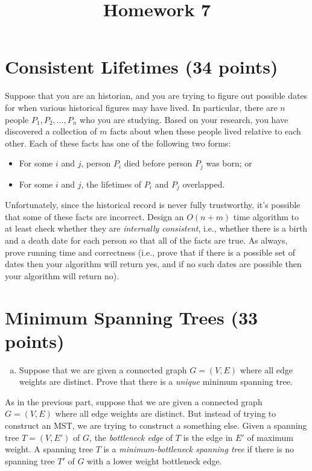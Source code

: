 \documentclass{article}
\begin{document}
\title{Homework 7}
\maketitle
\thispagestyle{fancy}


\section{Consistent Lifetimes (34 points)}

Suppose that you are an historian, and you are trying to figure out possible dates for when various historical figures may have lived.  In particular, there are $n$ people $P_1, P_2, \dots, P_n$ who you are studying.  Based on your research, you have discovered a collection of $m$ facts about when these people lived relative to each other.  Each of these facts has one of the following two forms:
\begin{itemize}
\item For some $i$ and $j$, person $P_i$ died before person $P_j$ was born; or
\item For some $i$ and $j$, the lifetimes of $P_i$ and $P_j$ overlapped.
\end{itemize}

Unfortunately, since the historical record is never fully trustworthy, it's possible that some of these facts are incorrect.  Design an $O(n+m)$ time algorithm to at least check whether they are \emph{internally consistent}, i.e., whether there is a birth and a death date for each person so that all of the facts are true.  As always, prove running time and correctness (i.e., prove that if there is a possible set of dates then your algorithm will return yes, and if no such dates are possible then your algorithm will return no).

\section{Minimum Spanning Trees (33 points)}

\begin{enumerate}[(a)]
\item Suppose that we are given a connected graph $G = (V, E)$ where all edge weights are distinct.  Prove that there is a \emph{unique} minimum spanning tree.  
\end{enumerate}

As in the previous part, suppose that we are given a connected graph $G = (V, E)$ where all edge weights are distinct.  But instead of trying to construct an MST, we are trying to construct a something else.  Given a spanning tree $T = (V, E')$ of $G$, the \emph{bottleneck edge} of $T$ is the edge in $E'$ of maximum weight.  A spanning tree $T$ is a \emph{minimum-bottleneck spanning tree} if there is no spanning tree $T'$ of $G$ with a lower weight bottleneck edge.
\end{document}
